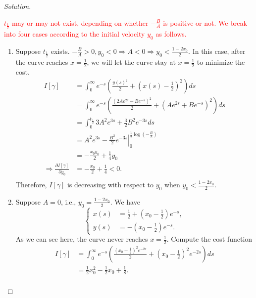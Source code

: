 \documentclass[english,reqno]{amsart}
\newenvironment{solution}
  {\renewcommand\qedsymbol{$\blacksquare$}\begin{proof}[Solution]}
  {\end{proof}}
\begin{document}
\begin{enumerate}[label=\arabic*)]
\begin{solution}
\begin{itemize}
\begin{enumerate}
\textcolor{red}{$t_{\frac{1}{2}}$ may or may not exist, depending on whether $\displaystyle -\frac{B}{A}$ is positive or not. We break into four cases according to the initial velocity $y_0$ as follows.} 
\begin{enumerate}
    \item Suppose $t_\frac{1}{2}$ exists. $\displaystyle -\frac{B}{A} > 0 , y_0 <0 \Rightarrow A<0 \Rightarrow y_0 < \frac{1-2x_0}{2}$. In this case, after the curve reaches $x=\frac{1}{2}$, we will let the curve stay at $x=\frac{1}{2}$ to minimize the cost.
    \begin{equation*}
    \begin{aligned}
        I[\gamma]&= \int_0^\infty e^{-s}\left( \frac{y(s)^2}{2} +(x(s)-\frac{1}{2})^2\right)ds\\
        &=\int_0^\infty e^{-s}\left( \frac{(2Ae^{2s}-Be^{-s})^2}{2} +(Ae^{2s}+Be^{-s})^2\right)ds\\
        &=\int_0^{t_\frac{1}{2}} 3A^2e^{3s}+\frac{3}{2}B^2e^{-3s}ds\\
        &=\left. A^2e^{3s}-\frac{B^2}{2}e^{-3s} \right|^{\frac{1}{3}\log \left(-\frac{B}{A}\right)}_0 \\
        &=-\frac{x_0y_0}{2}+\frac{1}{4}y_0\\
        \Longrightarrow \frac{\partial I[\gamma]}{\partial y_0} &= -\frac{x_0}{2}+\frac{1}{4}<0.\\
    \end{aligned}
    \end{equation*}
    Therefore, $I[\gamma]$ is decreasing with respect to $y_0$ when $\displaystyle y_0 < \frac{1-2x_0}{2}$. 
    
    \item Suppose $A=0$, i.e., $\displaystyle y_0=\frac{1-2x_0}{2}$. We have
    \begin{equation*}
     \left\{
        \begin{aligned}
        x(s)&=\frac{1}{2}+\left(x_0-\frac{1}{2}\right)e^{-s},\\
        y(s)&=-\left(x_0-\frac{1}{2}\right)e^{-s}.
        \end{aligned}
    \right.
    \end{equation*}
    As we can see here, the curve never reaches $x=\frac{1}{2}$. Compute the cost function
    \begin{equation*}
        \begin{aligned}
         I[\gamma] &= \int_0^\infty e^{-s}\left( \frac{(x_0-\frac{1}{2})^2e^{-2s}}{2} +(x_0-\frac{1}{2})^2e^{-2s}\right)ds\\
          &=\frac{1}{2}x_0^2-\frac{1}{2}x_0+\frac{1}{8}.\\
        \end{aligned}
    \end{equation*}
    

\end{enumerate}
\end{enumerate}
\end{itemize}
\end{solution}
\end{enumerate}
\end{document}
